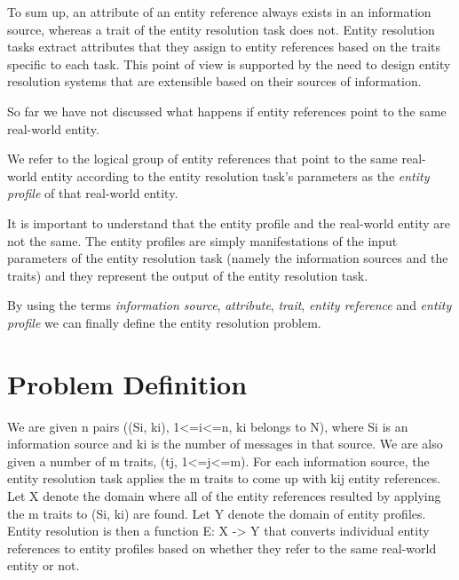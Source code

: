 \documentclass[11pt]{article}
\begin{document}
    To sum up, an attribute of an entity reference always exists in an
    information source, whereas a trait of the entity resolution task does not.
    Entity resolution tasks extract attributes that they assign to entity
    references based on the traits specific to each task.
    This point of view is supported by the need to design entity resolution
    systems that are extensible based on their sources of
    information\cite{fever2009}\cite{magellan2020}\cite{oyster2012}.

    So far we have not discussed what happens if entity references point to the
    same real-world entity.
    
    \begin{defn}
        We refer to the logical group of entity references that point to
        the same real-world entity according to the entity resolution task's
        parameters as the \textit{entity profile} of that real-world entity.
    \end{defn}

    It is important to understand that the entity profile and the real-world
    entity are not the same.
    The entity profiles are simply manifestations of the input parameters of the
    entity resolution task (namely the information sources and the traits) and
    they represent the output of the entity resolution task.
    
    By using the terms \textit{information source}, \textit{attribute},
    \textit{trait}, \textit{entity reference} and \textit{entity profile} we can
    finally define the entity resolution problem.

    \section{Problem Definition}\label{sec:problem}

    We are given n pairs ((Si, ki), 1<=i<=n, ki belongs to N), where Si is an information source and ki is
    the number of messages in that source.
    We are also given a number of m traits, (tj, 1<=j<=m).
    For each information source, the entity resolution task applies the m traits
    to come up with kij entity references.
    Let X denote the domain where all of the entity references resulted by
    applying the m traits to (Si, ki) are found.
    Let Y denote the domain of entity profiles.
    Entity resolution is then a function E: X -> Y that converts individual
    entity references to entity profiles based on whether they refer to the
    same real-world entity or not.
\end{document}
